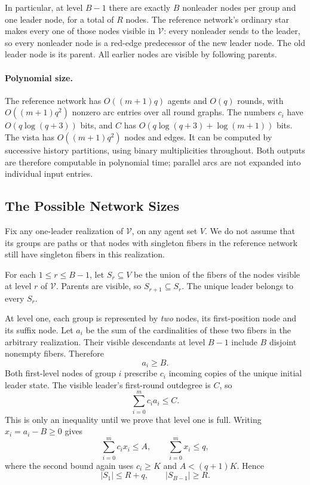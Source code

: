 \documentclass[11pt]{article}
\begin{document}
In particular, at level \(B-1\) there are exactly \(B\) nonleader
nodes per group and one leader node, for a total of \(R\) nodes.
The reference network's ordinary star makes every one of those nodes visible
in \(\mathcal V\): every nonleader sends to the leader, so every
nonleader node is a red-edge predecessor of the new leader node.
The old leader node is its parent. All earlier nodes are visible by
following parents.

\paragraph{Polynomial size.}
The reference network has \(O((m+1)q)\) agents and \(O(q)\) rounds, with
\(O((m+1)q^2)\) nonzero arc entries over all round graphs.
The numbers \(c_i\) have \(O(q\log(q+3))\) bits, and \(C\) has
\(O(q\log(q+3)+\log(m+1))\) bits.
The vista has \(O((m+1)q^2)\) nodes and edges.
It can be computed by successive history partitions, using binary
multiplicities throughout. Both outputs are therefore computable in
polynomial time; parallel arcs are not expanded into individual
input entries.

\subsection{The Possible Network Sizes}

Fix any one-leader realization of \(\mathcal V\), on any agent set
\(V\). We do not assume that its groups are paths or that nodes
with singleton fibers in the reference network still have singleton fibers
in this realization.

For each \(1\leq r\leq B-1\), let \(S_r\subseteq V\) be the union
of the fibers of the nodes visible at level \(r\) of \(\mathcal V\).
Parents are visible, so \(S_{r+1}\subseteq S_r\).
The unique leader belongs to every \(S_r\).

At level one, each group is represented by \emph{two} nodes, its
first-position node and its suffix node. Let \(a_i\) be the sum of
the cardinalities of these two fibers in the arbitrary realization.
Their visible descendants at level \(B-1\) include \(B\) disjoint
nonempty fibers. Therefore
\[
 a_i\geq B.
\]
Both first-level nodes of group \(i\) prescribe \(c_i\) incoming
copies of the unique initial leader state. The visible leader's
first-round outdegree is \(C\), so
\[
 \sum_{i=0}^m c_i a_i\leq C.
\]
This is only an inequality until we prove that level one is full.
Writing \(x_i=a_i-B\geq0\) gives
\[
 \sum_{i=0}^m c_i x_i\leq A,
 \qquad
 \sum_{i=0}^m x_i\leq q,
\]
where the second bound again uses \(c_i\geq K\) and
\(A<(q+1)K\). Hence
\begin{equation}
 |S_1|\leq R+q,\qquad |S_{B-1}|\geq R.
 \label{eq:visible-bounds}
\end{equation}
\end{document}
